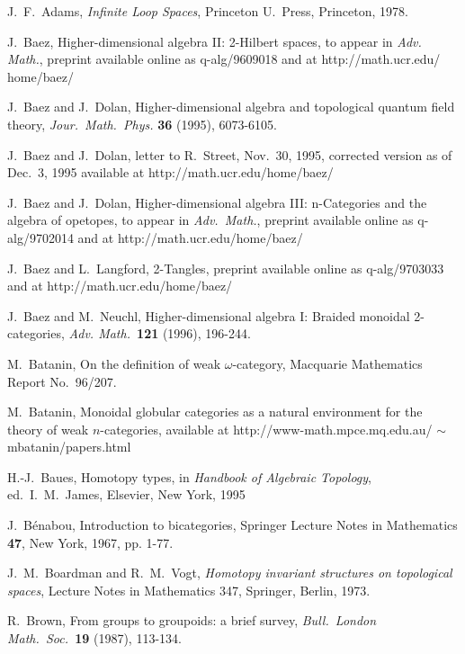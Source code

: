 \begin{thebibliography}{10}
 
 J.\ F.\ Adams, {\sl Infinite Loop Spaces}, Princeton
U.\ Press, Princeton, 1978.

 J.\ Baez, Higher-dimensional algebra II: 2-Hilbert spaces, 
to appear in {\sl Adv. Math.}, preprint available online as 
q-alg/9609018 and at http://math.ucr.edu/ home/baez/ 

 J.\ Baez and J.\ Dolan, Higher-dimensional algebra
and topological quantum field theory, {\sl Jour.\ Math.\ Phys.} {\bf 36}
(1995), 6073-6105. 

 J.\ Baez and J.\ Dolan, letter to R.\ Street, Nov.\ 30,
1995, corrected version as of Dec.\ 3, 1995 available at
http://math.ucr.edu/home/baez/ 

 J.\ Baez and J.\ Dolan, Higher-dimensional algebra III:
n-Categories and the algebra of opetopes, to appear in {\sl Adv.\ Math.}, 
preprint available online as q-alg/9702014 and
at http://math.ucr.edu/home/baez/

 J.\ Baez and L.\ Langford, 2-Tangles, preprint available
online as q-alg/9703033 and at http://math.ucr.edu/home/baez/ 

 J.\ Baez and M.\ Neuchl,
Higher-dimensional algebra I: Braided monoidal 2-categories, 
{\sl Adv. Math.\ }{\bf 121} (1996), 196-244.

 M.\ Batanin, On the definition of weak
$\omega$-category, Macquarie Mathematics Report No.\ 96/207.

 M.\ Batanin, Monoidal globular categories as a
natural environment for the theory of weak $n$-categories, available at 
http://www-math.mpce.mq.edu.au/ $\sim$mbatanin/papers.html

 H.-J.\ Baues, Homotopy types, in {\sl Handbook of
Algebraic Topology}, ed.\ I.\ M.\ James, Elsevier, New York, 1995

 J.\ B\'enabou, Introduction to bicategories,
Springer Lecture Notes in Mathematics {\bf 47}, New York, 1967, pp. 1-77.

 J.\ M.\ Boardman and R.\ M.\ Vogt, {\sl Homotopy invariant
structures on topological spaces}, Lecture Notes in Mathematics 347,
Springer, Berlin, 1973.

 R.\ Brown, From groups to groupoids: a brief survey, 
{\sl Bull.\ London Math.\ Soc.\ }{\bf 19} (1987), 113-134.


\end{thebibliography}
